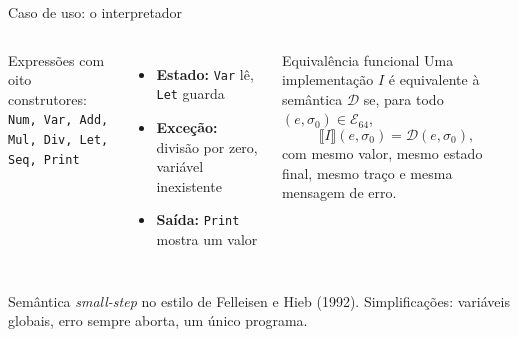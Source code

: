 \documentclass[aspectratio=169,10pt,xcolor={table}]{beamer}
\newcommand{\fonte}[1]{\par\vfill{\fontsize{7}{9}\selectfont\color{rodape}#1\par}\vskip1mm}
\begin{document}
\begin{frame}{Caso de uso: o interpretador}
  \begin{columns}[T]
    Expressões com oito construtores:\\[1mm]
    {\small\texttt{Num, Var, Add, Mul, Div, Let, Seq, Print}}
    \vskip3mm
    \begin{itemize}
      \item \textbf{Estado:} \texttt{Var} lê, \texttt{Let} guarda
      \item \textbf{Exceção:} divisão por zero, variável inexistente
      \item \textbf{Saída:} \texttt{Print} mostra um valor
    \end{itemize}
    \begin{definicao}{Equivalência funcional}
      Uma implementação $I$ é equivalente à semântica $\mathcal{D}$ se, para todo
      $(e,\sigma_0) \in \mathcal{E}_{64}$,
      \[ \llbracket I \rrbracket(e,\sigma_0) = \mathcal{D}(e,\sigma_0), \]
      com mesmo valor, mesmo estado final, mesmo traço e mesma mensagem de erro.
    \end{definicao}
  \end{columns}
  \fonte{Semântica \emph{small-step} no estilo de Felleisen e Hieb (1992). Simplificações: variáveis globais, erro sempre aborta, um único programa.}
\end{frame}
\end{document}
